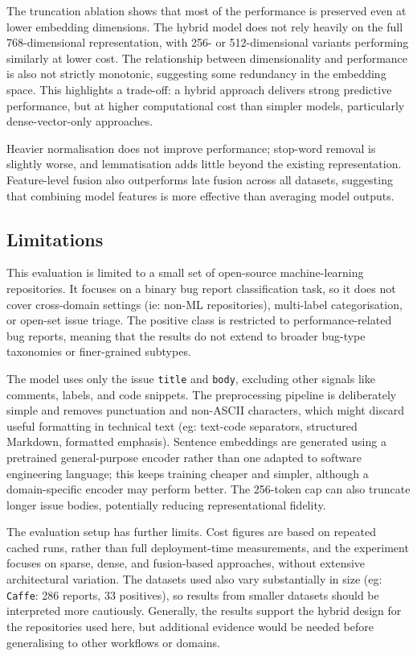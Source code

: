 \documentclass[10pt,a4paper]{article}
\begin{document}
The truncation ablation shows that most of the performance is preserved even at lower embedding dimensions. The hybrid model does not rely heavily on the full 768-dimensional representation, with 256- or 512-dimensional variants performing similarly at lower cost. The relationship between dimensionality and performance is also not strictly monotonic, suggesting some redundancy in the embedding space. This highlights a trade-off: a hybrid approach delivers strong predictive performance, but at higher computational cost than simpler models, particularly dense-vector-only approaches.

Heavier normalisation does not improve performance; stop-word removal is slightly worse, and lemmatisation adds little beyond the existing representation. Feature-level fusion also outperforms late fusion across all datasets, suggesting that combining model features is more effective than averaging model outputs.

\subsection{Limitations}

This evaluation is limited to a small set of open-source machine-learning repositories. It focuses on a binary bug report classification task, so it does not cover cross-domain settings (ie: non-ML repositories), multi-label categorisation, or open-set issue triage. The positive class is restricted to performance-related bug reports, meaning that the results do not extend to broader bug-type taxonomies or finer-grained subtypes.

The model uses only the issue \texttt{title} and \texttt{body}, excluding other signals like comments, labels, and code snippets. The preprocessing pipeline is deliberately simple and removes punctuation and non-ASCII characters, which might discard useful formatting in technical text (eg: text-code separators, structured Markdown, formatted emphasis).
Sentence embeddings are generated using a pretrained general-purpose encoder rather than one adapted to software engineering language; this keeps training cheaper and simpler, although a domain-specific encoder may perform better. The 256-token cap can also truncate longer issue bodies, potentially reducing representational fidelity.

The evaluation setup has further limits. Cost figures are based on repeated cached runs, rather than full deployment-time measurements, and the experiment focuses on sparse, dense, and fusion-based approaches, without extensive architectural variation. The datasets used also vary substantially in size (eg: \texttt{Caffe}: 286 reports, 33 positives), so results from smaller datasets should be interpreted more cautiously. Generally, the results support the hybrid design for the repositories used here, but additional evidence would be needed before generalising to other workflows or domains.
\end{document}

